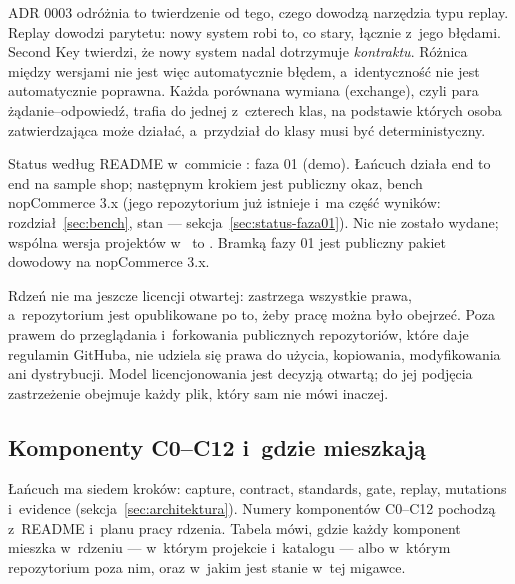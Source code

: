 ADR 0003 odróżnia to twierdzenie od tego, czego dowodzą narzędzia typu replay. Replay
dowodzi parytetu: nowy system robi to, co stary, łącznie z~jego błędami. Second Key twierdzi,
że nowy system nadal dotrzymuje \emph{kontraktu}. Różnica między wersjami nie jest więc
automatycznie błędem, a~identyczność nie jest automatycznie poprawna. Każda porównana
wymiana (exchange), czyli para żądanie–odpowiedź, trafia do jednej z~czterech klas, na
podstawie których osoba zatwierdzająca może działać, a~przydział do klasy musi być
deterministyczny.

Status według README w~commicie : faza 01 (demo). Łańcuch działa end to end na sample shop; następnym
krokiem jest publiczny okaz, bench nopCommerce 3.x (jego repozytorium już istnieje i~ma część wyników:
rozdział~\ref{sec:bench}, stan --- sekcja~\ref{sec:status-faza01}). Nic nie zostało wydane; wspólna wersja
projektów w~ to . Bramką fazy 01 jest publiczny
pakiet dowodowy na nopCommerce 3.x.

Rdzeń nie ma jeszcze licencji otwartej:  zastrzega wszystkie prawa,
a~repozytorium jest opublikowane po to, żeby pracę można było obejrzeć. Poza prawem do
przeglądania i~forkowania publicznych repozytoriów, które daje regulamin GitHuba, nie
udziela się prawa do użycia, kopiowania, modyfikowania ani dystrybucji. Model
licencjonowania jest decyzją otwartą; do jej podjęcia zastrzeżenie obejmuje każdy plik,
który sam nie mówi inaczej.


\subsection{Komponenty C0–C12 i~gdzie mieszkają}\label{sec:rdzen-komponenty}

Łańcuch ma siedem kroków: capture, contract, standards, gate, replay, mutations i~evidence
(sekcja~\ref{sec:architektura}). Numery komponentów C0–C12 pochodzą z~README i~planu pracy
rdzenia. Tabela mówi, gdzie każdy komponent mieszka w~rdzeniu --- w~którym projekcie i~katalogu --- albo w~którym repozytorium poza nim, oraz w~jakim jest stanie w~tej migawce.

